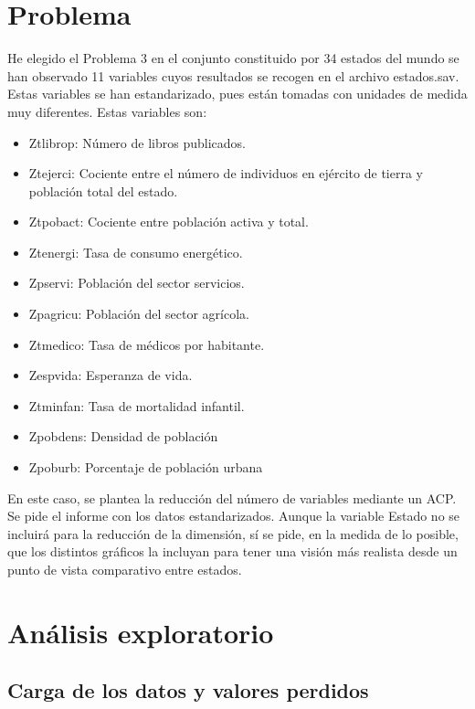 \documentclass[12pt,twoside]{report}
\begin{document}
\chapter*{Problema}

He elegido el Problema 3 en el conjunto constituido por 34 estados del mundo se han observado 11 variables cuyos
resultados se recogen en el archivo estados.sav. Estas variables se han estandarizado,
pues están tomadas con unidades de medida muy diferentes. Estas variables son:
\begin{itemize}
\item Ztlibrop: Número de libros publicados.
\item Ztejerci: Cociente entre el número de individuos en ejército de tierra y población
total del estado.
\item Ztpobact: Cociente entre población activa y total.
\item Ztenergi: Tasa de consumo energético.
\item Zpservi: Población del sector servicios.
\item Zpagricu: Población del sector agrícola.
\item Ztmedico: Tasa de médicos por habitante.
\item Zespvida: Esperanza de vida.
\item Ztminfan: Tasa de mortalidad infantil.
\item Zpobdens: Densidad de población
\item Zpoburb: Porcentaje de población urbana
\end{itemize}

En este caso, se plantea la reducción del número de variables mediante un ACP. Se pide el informe con los datos estandarizados. Aunque la
variable Estado no se incluirá para la reducción de la dimensión, sí se pide, en la medida
de lo posible, que los distintos gráficos la incluyan para tener una visión más realista
desde un punto de vista comparativo entre estados. 

\chapter*{Análisis exploratorio}

\section*{Carga de los datos y valores perdidos}
\end{document}
